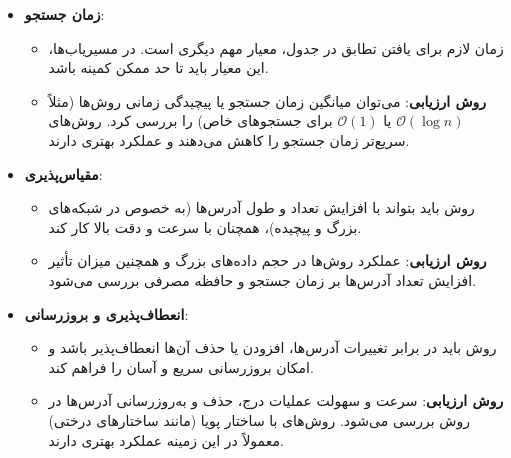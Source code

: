 \begin{itemize}
\begin{qsolve}
\begin{itemize}
			\item \textbf{زمان جستجو}:
			\begin{itemize}
				\item زمان لازم برای یافتن تطابق در جدول، معیار مهم دیگری است. در مسیر‌یاب‌ها، این معیار باید تا حد ممکن کمینه باشد.
				\item \textbf{روش ارزیابی}: می‌توان میانگین زمان جستجو یا پیچیدگی زمانی روش‌ها (مثلاً \(\mathcal{O}(\log n)\) یا \(\mathcal{O}(1)\) برای جستجوهای خاص) را بررسی کرد. روش‌های سریع‌تر زمان جستجو را کاهش می‌دهند و عملکرد بهتری دارند.
			\end{itemize}
		\end{itemize}
	\end{qsolve}
	
	\begin{qsolve}
		\begin{itemize}
			\item \textbf{مقیاس‌پذیری}:
			\begin{itemize}
				\item روش باید بتواند با افزایش تعداد و طول آدرس‌ها (به خصوص در شبکه‌های بزرگ و پیچیده)، همچنان با سرعت و دقت بالا کار کند.
				\item \textbf{روش ارزیابی}: عملکرد روش‌ها در حجم داده‌های بزرگ و همچنین میزان تأثیر افزایش تعداد آدرس‌ها بر زمان جستجو و حافظه مصرفی بررسی می‌شود.
			\end{itemize}
			
			\item \textbf{انعطاف‌پذیری و بروزرسانی}:
			\begin{itemize}
				\item روش باید در برابر تغییرات آدرس‌ها، افزودن یا حذف آن‌ها انعطاف‌پذیر باشد و امکان بروزرسانی سریع و آسان را فراهم کند.
				\item \textbf{روش ارزیابی}: سرعت و سهولت عملیات درج، حذف و به‌روزرسانی آدرس‌ها در روش بررسی می‌شود. روش‌های با ساختار پویا (مانند ساختارهای درختی) معمولاً در این زمینه عملکرد بهتری دارند.
			\end{itemize}
		\end{itemize}
	\end{qsolve}
	
	
	

\end{itemize}
